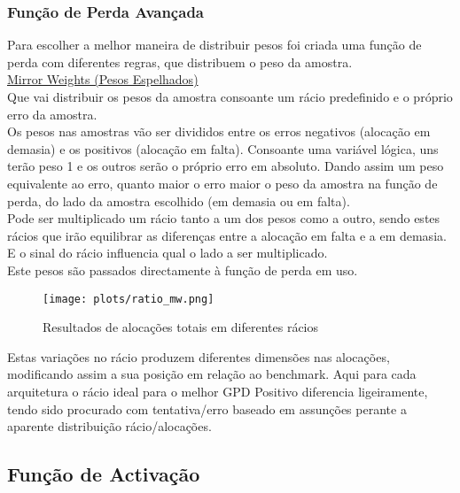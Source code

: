 

\subsubsection{Função de Perda Avançada}\label{se:advancedloss}

Para escolher a melhor maneira de distribuir pesos foi criada uma função de perda com diferentes regras, que distribuem o peso da amostra.\\
\href{https://github.com/alquimodelia/alquitable/blob/main/alquitable/advanced_losses.py#L33}{Mirror Weights (Pesos Espelhados)}\\
Que vai distribuir os pesos da amostra consoante um rácio predefinido e o próprio erro da amostra.\\
Os pesos nas amostras vão ser divididos entre os erros negativos (alocação em demasia) e os positivos (alocação em falta). Consoante uma variável lógica,  uns terão peso 1 e os outros serão o próprio erro em absoluto. Dando assim um peso equivalente ao erro, quanto maior o erro maior o peso da amostra na função de perda, do lado da amostra escolhido (em demasia ou em falta).\\
Pode ser multiplicado um rácio tanto a um dos pesos como a outro, sendo estes rácios que irão equilibrar as diferenças entre a alocação em falta e a em demasia. E o sinal do rácio influencia qual o lado a ser multiplicado.\\
Este pesos são passados directamente à função de perda em uso.\\


\begin{figure}[H]
    \centering
    \texttt{[image: plots/ratio\_mw.png]}
    \caption{Resultados de alocações totais em diferentes rácios}
    \label{fig:resexpratiomw}
  \end{figure}

Estas variações no rácio produzem diferentes dimensões nas alocações, modificando assim a sua posição em relação ao benchmark. Aqui para cada arquitetura o rácio ideal para o melhor GPD Positivo diferencia ligeiramente, tendo sido procurado com tentativa/erro baseado em assunções perante a aparente distribuição rácio/alocações.\\


\subsection{Função de Activação}

